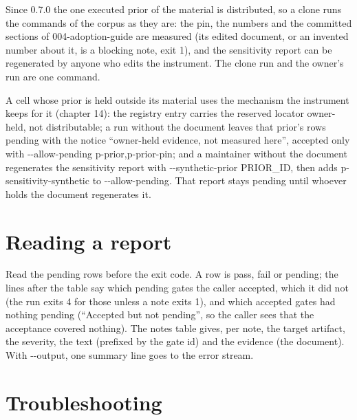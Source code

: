 \documentclass[
  american,
  10pt,
]{report}
\renewcommand{\texttt}[1]{{\ttfamily\hyphenchar\font=-1 #1}}
\begin{document}
Since 0.7.0 the one executed prior of the material is distributed, so a
clone runs the commands of the corpus as they are: the pin, the numbers
and the committed sections of
\texttt{004-\allowbreak{}adoption-\allowbreak{}guide} are measured (its
edited document, or an invented number about it, is a blocking note,
exit 1), and the sensitivity report can be regenerated by anyone who
edits the instrument. The clone run and the owner's run are one command.

A cell whose prior is held outside its material uses the mechanism the
instrument keeps for it (chapter 14): the registry entry carries the
reserved locator \texttt{owner-\allowbreak{}held, not distributable}; a
run without the document leaves that prior's rows pending with the
notice ``owner-held evidence, not measured here'', accepted only with
\texttt{-\allowbreak{}-\allowbreak{}allow-\allowbreak{}pending p-\allowbreak{}prior,p-\allowbreak{}prior-\allowbreak{}pin};
and a maintainer without the document regenerates the sensitivity report
with
\texttt{-\allowbreak{}-\allowbreak{}synthetic-\allowbreak{}prior PRIOR\_\allowbreak{}ID},
then adds \texttt{p-\allowbreak{}sensitivity-\allowbreak{}synthetic} to
\texttt{-\allowbreak{}-\allowbreak{}allow-\allowbreak{}pending}. That
report stays pending until whoever holds the document regenerates it.

\section{Reading a report}\label{reading-a-report}

Read the pending rows before the exit code. A row is \texttt{pass},
\texttt{fail} or \texttt{pending}; the lines after the table say which
pending gates the caller accepted, which it did not (the run exits 4 for
those unless a note exits 1), and which accepted gates had nothing
pending (``Accepted but not pending'', so the caller sees that the
acceptance covered nothing). The notes table gives, per note, the target
artifact, the severity, the text (prefixed by the gate id) and the
evidence (the document). With
\texttt{-\allowbreak{}-\allowbreak{}output}, one summary line goes to
the error stream.

\section{Troubleshooting}\label{troubleshooting}
\end{document}
